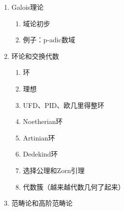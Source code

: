\documentclass[../main.tex]{subfiles}
\begin{document}
\begin{multicols}{2}
\begin{enumerate}
\begin{enumerate}
    \end{enumerate}
    \item Galois理论
    \begin{enumerate}
        \item 域论初步
        \item 例子：p-adic数域
    \end{enumerate}
    \item 环论和交换代数
    \begin{enumerate}
        \item 环
        \item 理想
        \item UFD、PID、欧几里得整环
        \item Noetherian环
        \item Artinian环
        \item Dedekind环
        \item 选择公理和Zorn引理
        \item 代数簇（越来越代数几何了起来）
    \end{enumerate}
    \item 范畴论和高阶范畴论
\end{enumerate}
\end{multicols}
\biblio
\end{document}
